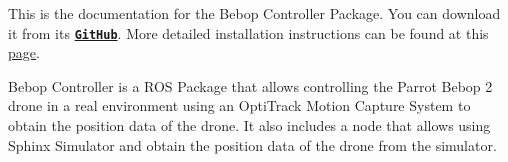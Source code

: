 This is the documentation for the Bebop Controller Package. You can download it from its \href{https://github.com/Francisco8382/bebop_controller}{\texttt{ {\bfseries{Git\+Hub}}}}. More detailed installation instructions can be found at this \mbox{\hyperlink{installation}{page}}.

Bebop Controller is a ROS Package that allows controlling the Parrot Bebop 2 drone in a real environment using an Opti\+Track Motion Capture System to obtain the position data of the drone. It also includes a node that allows using Sphinx Simulator and obtain the position data of the drone from the simulator. 